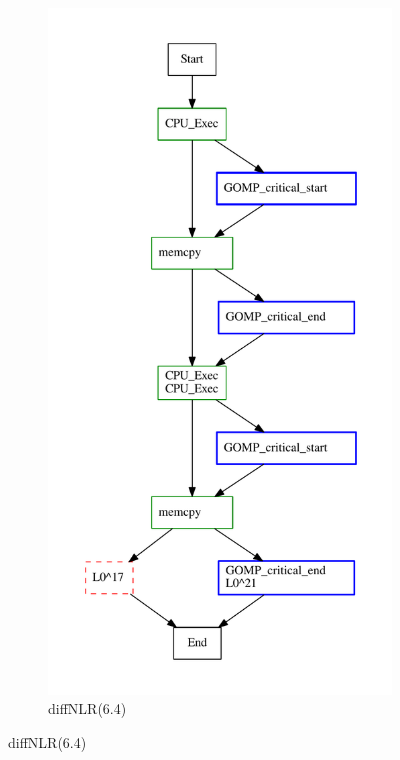 \begin{figure}
     \centering
     \begin{subfigure}[b]{0.31\textwidth}
        \centering
\includegraphics[width=\textwidth]{diffTrace/figs/diffNLR/ompBug-6-4-x0.pdf}
\caption{diffNLR(6.4)}

\end{subfigure}
\end{figure}
